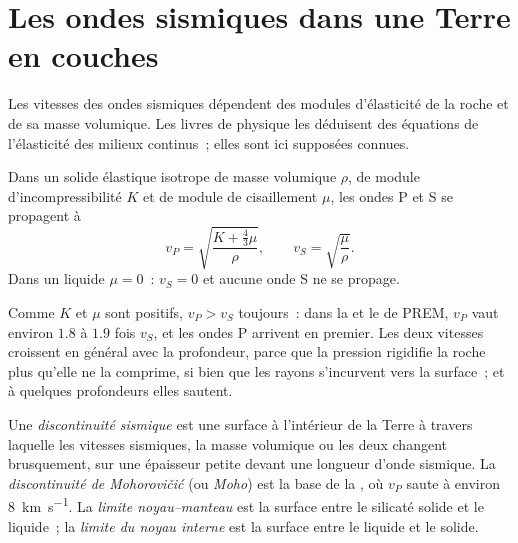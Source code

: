 \section{Les ondes sismiques dans une Terre en couches}

Les vitesses des ondes sismiques dépendent des modules d'élasticité de la roche et
de sa masse volumique. Les livres de physique les déduisent des équations de
l'élasticité des milieux continus~; elles sont ici supposées connues.

\begin{proposition}\label{prop:b1:layered-earth:speeds}
Dans un solide élastique isotrope de masse volumique $\rho$, de module
d'incompressibilité $K$ et de module de cisaillement $\mu$, les ondes P et S se
propagent à
\[
  v_P = \sqrt{\frac{K + \tfrac43\mu}{\rho}}, \qquad v_S = \sqrt{\frac{\mu}{\rho}}.
\]
Dans un liquide $\mu = 0$~: $v_S = 0$ et aucune onde S ne se propage.
\end{proposition}
\admitted

Comme $K$ et $\mu$ sont positifs, $v_P > v_S$ toujours~: dans la  et le
 de PREM, $v_P$ vaut environ $1.8$ à $1.9$ fois $v_S$, et les ondes P
arrivent en premier. Les deux vitesses croissent en général avec la profondeur,
parce que la pression rigidifie la roche plus qu'elle ne la comprime, si bien que
les rayons s'incurvent vers la surface~; et à quelques profondeurs elles sautent.

\begin{definition}
\label{def:b1:layered-earth:discontinuity}
Une \emph{discontinuité sismique} est une surface à l'intérieur de la Terre à travers
laquelle les vitesses sismiques, la masse volumique ou les deux changent
brusquement, sur une épaisseur petite devant une longueur d'onde sismique. La
\emph{discontinuité de Mohorovičić} (ou
\emph{Moho}) est la base de la , où $v_P$ saute à environ
\qty{8}{km.s^{-1}}. La \emph{limite noyau--manteau} est la surface entre le 
silicaté solide et le  liquide~; la \emph{limite du noyau
interne} est la surface entre le  liquide et le 
solide.
\end{definition}

